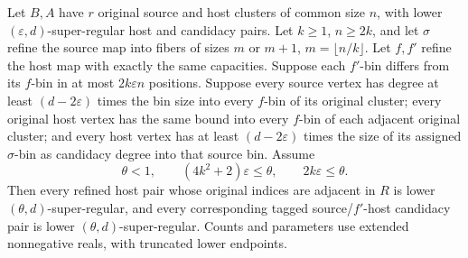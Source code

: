\begin{lemma}
Let $B,A$ have $r$ original source and host clusters of common size $n$,
with lower $(\varepsilon,d)$-super-regular host and candidacy pairs.
Let $k\geq1$, $n\geq2k$, and let $\sigma$ refine the source map into
fibers of sizes $m$ or $m+1$, $m=\lfloor n/k\rfloor$. Let $f,f'$
refine the host map with exactly the same capacities. Suppose each
$f'$-bin differs from its $f$-bin in at most $2k\varepsilon n$ positions.
Suppose every source vertex has degree at least $(d-2\varepsilon)$
times the bin size into every $f$-bin of its original cluster;
every original host vertex has the same bound into every $f$-bin
of each adjacent original cluster; and every host vertex has at least
$(d-2\varepsilon)$ times the size of its assigned $\sigma$-bin
as candidacy degree into that source bin. Assume
\[
 \theta<1,\qquad (4k^2+2)\varepsilon\leq\theta,
 \qquad 2k\varepsilon\leq\theta.
\]
Then every refined host pair whose original indices are adjacent in
$R$ is lower $(\theta,d)$-super-regular, and every corresponding
tagged source/$f'$-host candidacy pair is lower
$(\theta,d)$-super-regular. Counts and parameters use extended
nonnegative reals, with truncated lower endpoints.
\end{lemma}
